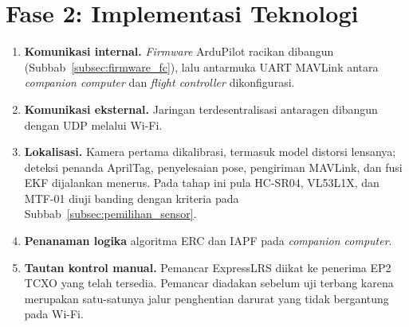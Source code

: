 \documentclass[12pt,a4paper]{report}
\begin{document}
\section{Fase 2: Implementasi Teknologi}

\begin{enumerate}
    \item \textbf{Komunikasi internal.} \textit{Firmware} ArduPilot racikan dibangun (Subbab~\ref{subsec:firmware_fc}), lalu antarmuka UART MAVLink antara \textit{companion computer} dan \textit{flight controller} dikonfigurasi.
    \item \textbf{Komunikasi eksternal.} Jaringan terdesentralisasi antaragen dibangun dengan UDP melalui Wi-Fi.
    \item \textbf{Lokalisasi.} Kamera pertama dikalibrasi, termasuk model distorsi lensanya; deteksi penanda AprilTag, penyelesaian pose, pengiriman MAVLink, dan fusi EKF dijalankan menerus. Pada tahap ini pula HC-SR04, VL53L1X, dan MTF-01 diuji banding dengan kriteria pada Subbab~\ref{subsec:pemilihan_sensor}.
    \item \textbf{Penanaman logika} algoritma ERC dan IAPF pada \textit{companion computer}.
    \item \textbf{Tautan kontrol manual.} Pemancar ExpressLRS diikat ke penerima EP2 TCXO yang telah tersedia. Pemancar diadakan sebelum uji terbang karena merupakan satu-satunya jalur penghentian darurat yang tidak bergantung pada Wi-Fi.
\end{enumerate}
\end{document}
